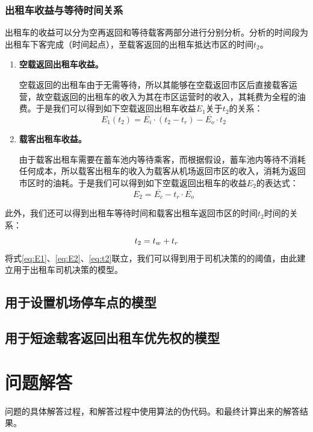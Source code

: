 \documentclass{cumcm}
\begin{document}
\subsubsection{出租车收益与等待时间关系}
出租车的收益可以分为空再返回和等待载客两部分进行分别分析。分析的时间段为出租车下客完成（时间起点），至载客返回的出租车抵达市区的时间$t_2$。
\begin{enumerate}[(1)]
	\item \textbf{空载返回出租车收益。}\par
	空载返回的出租车由于无需等待，所以其能够在空载返回市区后直接载客运营，故空载返回的出租车的收入为其在市区运营时的收入，其耗费为全程的油费。于是我们可以得到如下空载返回出租车收益$E_1$关于$t_2$的关系：
	\begin{equation}
		E_1(t_2)=\overline{E_i}\cdot(t_2-t_r)-\overline{E_o}\cdot t_2
		\label{eq:E1}
	\end{equation}
	\item \textbf{载客出租车收益。}\par
	由于载客出租车需要在蓄车池内等待乘客，而根据假设，蓄车池内等待不消耗任何成本，所以载客出租车的收入为载客从机场返回市区的收入，消耗为返回市区时的油耗。于是我们可以得到如下空载返回出租车的收益$E_2$的表达式：
	\begin{equation}
		E_2=\overline{E_c}-t_r\cdot\overline{E_o}
		\label{eq:E2}
	\end{equation}
\end{enumerate}
\par
此外，我们还可以得到出租车等待时间\waittime 和载客出租车返回市区的时间$t_2$时间的关系：
\begin{equation}
	t_2=\mbox{$t_w$}+t_r
	\label{eq:t2}
\end{equation}
将式\ref{eq:E1}、\ref{eq:E2}、\ref{eq:t2}联立，我们可以得到用于司机决策的\waittime 的阈值，由此建立用于出租车司机决策的模型。
\subsection{用于设置机场停车点的模型}

\subsection{用于短途载客返回出租车优先权的模型}

\section{问题解答}
问题的具体解答过程，和解答过程中使用算法的伪代码。和最终计算出来的解答结果。
\end{document}
